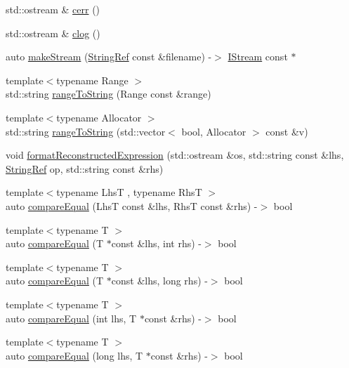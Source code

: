 \begin{DoxyCompactItemize}
std\-::ostream \& \hyperlink{namespace_catch_a4e5b5dc07abdfa30de33593dfab71f43}{cerr} ()
\item 
std\-::ostream \& \hyperlink{namespace_catch_a5a0677089050dcdb4848f56fb47e9279}{clog} ()
\item 
auto \hyperlink{namespace_catch_af6d27462573d60c30c51acf1c980e3ff}{make\-Stream} (\hyperlink{class_catch_1_1_string_ref}{String\-Ref} const \&filename) -\/$>$ \hyperlink{struct_catch_1_1_i_stream}{I\-Stream} const $\ast$
\item 
{\footnotesize template$<$typename Range $>$ }\\std\-::string \hyperlink{namespace_catch_af13494e925a793e3e7143c6ce6f442c2}{range\-To\-String} (Range const \&range)
\item 
{\footnotesize template$<$typename Allocator $>$ }\\std\-::string \hyperlink{namespace_catch_ae162dc66b7767a52e7e4283915fd3d9f}{range\-To\-String} (std\-::vector$<$ bool, Allocator $>$ const \&v)
\item 
void \hyperlink{namespace_catch_a520110c31f26cf9892595772ab814fc0}{format\-Reconstructed\-Expression} (std\-::ostream \&os, std\-::string const \&lhs, \hyperlink{class_catch_1_1_string_ref}{String\-Ref} op, std\-::string const \&rhs)
\item 
{\footnotesize template$<$typename Lhs\-T , typename Rhs\-T $>$ }\\auto \hyperlink{namespace_catch_af89b8df30cfaf09abd048c6ff67359ee}{compare\-Equal} (Lhs\-T const \&lhs, Rhs\-T const \&rhs) -\/$>$ bool
\item 
{\footnotesize template$<$typename T $>$ }\\auto \hyperlink{namespace_catch_a68f451c45e65f242dde5f21c19a4cf7a}{compare\-Equal} (T $\ast$const \&lhs, int rhs) -\/$>$ bool
\item 
{\footnotesize template$<$typename T $>$ }\\auto \hyperlink{namespace_catch_afca4a005e1053c542462dc7a603b41b3}{compare\-Equal} (T $\ast$const \&lhs, long rhs) -\/$>$ bool
\item 
{\footnotesize template$<$typename T $>$ }\\auto \hyperlink{namespace_catch_a6af99378569fc6f68270b6af669f1c3b}{compare\-Equal} (int lhs, T $\ast$const \&rhs) -\/$>$ bool
\item 
{\footnotesize template$<$typename T $>$ }\\auto \hyperlink{namespace_catch_a72f10ec2cad6db16029d48c8c1d9df2f}{compare\-Equal} (long lhs, T $\ast$const \&rhs) -\/$>$ bool

\end{DoxyCompactItemize}
